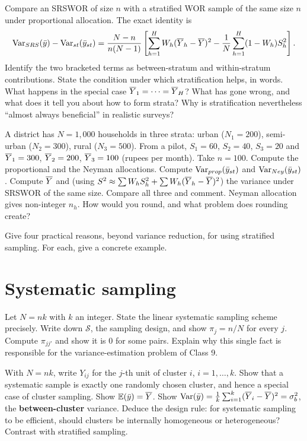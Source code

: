 Compare an SRSWOR of size $n$ with a stratified WOR sample of the same size $n$ under
proportional allocation. The exact identity is
\[
  \operatorname{Var}_{SRS}(\bar{y})-\operatorname{Var}_{st}(\bar{y}_{st})
  =\frac{N-n}{n(N-1)}\left[\sum_{h=1}^HW_h(\overline{Y}_h-\overline{Y})^2-\frac1N\sum_{h=1}^H(1-W_h)S_h^2\right].
\]
 Identify the two bracketed terms as between-stratum and within-stratum contributions.
 State the condition under which stratification helps, in words.
 What happens in the special case $\overline{Y}_1=\cdots=\overline{Y}_H$? What has gone wrong, and what
does it tell you about how to form strata?
 Why is stratification nevertheless ``almost always beneficial'' in realistic surveys?

A district has $N=1{,}000$ households in three strata: urban ($N_1=200$), semi-urban
($N_2=300$), rural ($N_3=500$). From a pilot, $S_1=60$, $S_2=40$, $S_3=20$ and
$\overline{Y}_1=300$, $\overline{Y}_2=200$, $\overline{Y}_3=100$ (rupees per month). Take $n=100$.
 Compute the proportional and the Neyman allocations.
 Compute $\operatorname{Var}_{prop}(\bar{y}_{st})$ and $\operatorname{Var}_{Ney}(\bar{y}_{st})$.
 Compute $\overline{Y}$ and (using $S^2\approx\sum W_hS_h^2+\sum W_h(\overline{Y}_h-\overline{Y})^2$) the
variance under SRSWOR of the same size. Compare all three and comment.
 Neyman allocation gives non-integer $n_h$. How would you round, and what problem does
rounding create?

Give four practical reasons, beyond variance reduction, for using stratified sampling. For each,
give a concrete example. 

\section{Systematic sampling}

Let $N=nk$ with $k$ an integer.
 State the linear systematic sampling scheme precisely.
 Write down $\mathcal S$, the sampling design, and show $\pi_j=n/N$ for every $j$.
 Compute $\pi_{jj'}$ and show it is $0$ for some pairs. Explain why this single fact is
responsible for the variance-estimation problem of Class 9.

With $N=nk$, write $Y_{ij}$ for the $j$-th unit of cluster $i$, $i=1,\dots,k$.
 Show that a systematic sample is exactly one randomly chosen cluster, and hence a special
case of cluster sampling.
 Show $\mathbb{E}(\bar{y})=\overline{Y}$.
 Show $\operatorname{Var}(\bar{y})=\frac1k\sum_{i=1}^k(\overline{Y}_i-\overline{Y})^2=\sigma_b^2$, the
\textbf{between-cluster} variance.
 Deduce the design rule: for systematic sampling to be efficient, should clusters be
internally homogeneous or heterogeneous? Contrast with stratified sampling.

